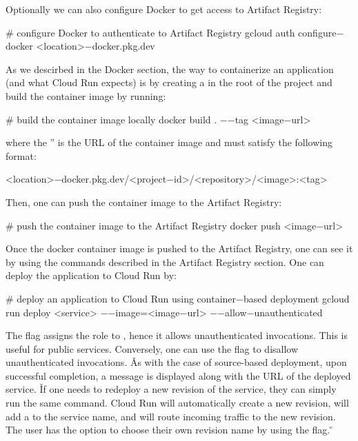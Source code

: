 Optionally we can also configure Docker to get access to Artifact Registry:
\begin{bash}
# configure Docker to authenticate to Artifact Registry
gcloud auth configure$-$docker <location>$-$docker.pkg.dev
\end{bash}

As we descirbed in the Docker section, the way to containerize an application (and what Cloud Run expects) is by
creating a  in the root of the project and build the container image by running:
\begin{bash}
# build the container image locally
docker build . $-$$-$tag <image$-$url>
\end{bash}

where the '' is the URL of the container image and must satisfy the following format:
\begin{block}
<location>$-$docker.pkg.dev/<project$-$id>/<repository>/<image>:<tag>
\end{block}

Then, one can push the container image to the Artifact Registry:
\begin{bash}
# push the container image to the Artifact Registry
docker push <image$-$url>
\end{bash}

Once the docker container image is pushed to the Artifact Registry, one can see it by using the commands described
in the Artifact Registry section. One can deploy the application to Cloud Run by:
\begin{bash}
# deploy an application to Cloud Run using container$-$based deployment
gcloud run deploy <service> $-$$-$image=<image$-$url> $-$$-$allow$-$unauthenticated
\end{bash}

The  flag assigns the  role to , hence it
allows unauthenticated invocations. This is useful for public services. Conversely, one can use the flag
 to disallow unauthenticated invocations. \v

As with the case of source-based deployment, upon successful completion, a message is displayed along with the URL
of the deployed service. \v

If one needs to redeploy a new revision of the service, they can simply run the same command. Cloud Run will
automatically create a new revision, will add a  to the service name, and will route incoming
traffic to the new revision. The user has the option to choose their own revision name by using the
 flag. \v

